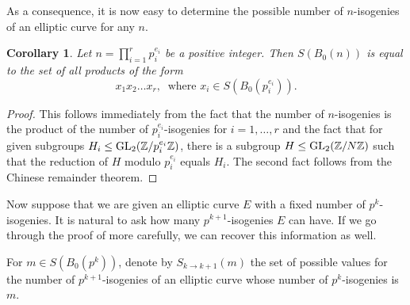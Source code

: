 \documentclass[10pt,leqno]{amsart}
\newcommand{\Z}{\mathbb{Z}}
\newcommand{\GL}{\textnormal{GL}}
\newtheorem{corollary}[theorem]{Corollary}
\theoremstyle{definition}
\theoremstyle{remark}
\numberwithin{theorem}{section}
\begin{document}
As a consequence, it is now easy to determine the possible number of $n$-isogenies of an elliptic curve for any $n$.

\begin{corollary}
    Let $n=\prod_{i=1}^r p_i^{e_i}$ be a positive integer. Then $S(B_0(n))$ is equal to the set of all products of the form $$x_1x_2 \ldots x_r, \ \text{ where } x_i \in S(B_0(p_i^{e_i})).$$
\end{corollary}
\begin{proof}
    This follows immediately from the fact that the number of $n$-isogenies is the product of the number of $p_i^{e_i}$-isogenies for $i=1,\ldots, r$ and the fact that for given subgroups $H_i\leq \GL_2(\Z/p_i^{e_i}\Z)$, there is a subgroup $H\leq \GL_2(\Z/N\Z)$ such that the reduction of $H$ modulo $p_i^{e_i}$ equals $H_i$. The second fact follows from the Chinese remainder theorem. 
\end{proof}
Now suppose that we are given an elliptic curve $E$ with a fixed number of $p^k$-isogenies. It is natural to ask how many $p^{k+1}$-isogenies $E$ can have. If we go through the proof of  more carefully, we can recover this information as well. 

For $m\in S(B_0(p^k))$, denote by $S_{k\to k+1}(m)$ the set of possible values for the number of $p^{k+1}$-isogenies of an elliptic curve whose number of $p^k$-isogenies is $m$. 
\end{document}
